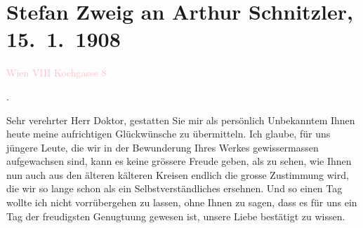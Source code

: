 

\renewcommand{\erwaehntePersonen}{Personen: Stefan Zweig}
\renewcommand{\erwaehnteOrte}{Orte: Kochgasse 8, Wien}
\renewcommand{\erwaehnteWerke}{Werke: Zwischenspiel. Komödie in drei Akten}
\section[Stefan Zweig an Arthur Schnitzler, 15. 1. 1908]{Stefan Zweig an Arthur Schnitzler, 15. 1. 1908}
\nopagebreak{}
\rehead{ }\normalsize\beginnumbering{}
\toendnotes[C]{\smallbreak\pagebreak[2]}
\toendnotes[C]{\smallbreak}
\pstart
           {\pb}\textcolor{pink}{Wien VIII Kochgasse 8}{}\ledrightnote{\textcolor{pink}{Kochgasse 8}}\pend
           
\pstart
           \label{K_L03621-1v}\label{K_L03621-1h}. \pend
           
\pstart{}Sehr verehrter Herr Doktor,\pend
\pstart
            gestatten Sie mir als persönlich Unbekanntem Ihnen \label{K_L03621-2v}\label{K_L03621-2h}heute meine
               aufrichtigen Glückwünsche zu übermitteln. Ich glaube, für uns jüngere Leute, die wir
               in der Bewunderung Ihres Werkes gewissermassen aufgewachsen sind, kann es keine
               grössere Freude geben, als zu sehen, wie Ihnen nun auch aus den älteren kälteren
               Kreisen endlich die grosse Zustimmung wird, die wir so lange schon als ein
               Selbstverständliches ersehnen. Und so einen Tag wollte ich nicht vorrübergehen zu
               lassen, ohne Ihnen zu sagen, dass {\pb}es
               für uns ein Tag der freudigsten Genugtuung gewesen ist, unsere Liebe bestätigt zu
               wissen.\pend
           
